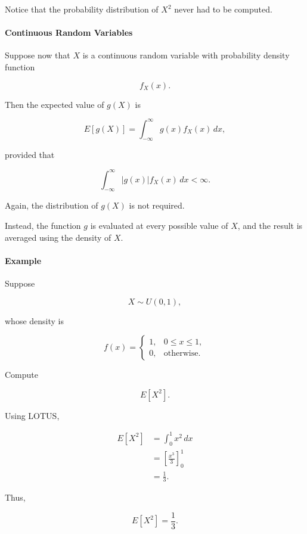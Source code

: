 \documentclass[11pt]{article}
\begin{document}
\begin{mdframed}[
		linewidth=0.8pt,
		roundcorner=6pt,
		backgroundcolor=gray!5,
		linecolor=gray!60,
		innertopmargin=10pt,
		innerbottommargin=10pt,
		innerleftmargin=10pt,
		innerrightmargin=10pt
		]
		Notice that the probability distribution of $X^2$ never had to be computed.
		
		\bigskip
		
		\paragraph{Continuous Random Variables}
		
		Suppose now that $X$ is a continuous random variable with probability
		density function
		
		\[
		f_X(x).
		\]
		
		Then the expected value of $g(X)$ is
		
		\[
		\boxed{
			E[g(X)]
			=
			\int_{-\infty}^{\infty}
			g(x)f_X(x)\,dx,
		}
		\]
		
		provided that
		
		\[
		\int_{-\infty}^{\infty}
		|g(x)|f_X(x)\,dx
		<
		\infty.
		\]
		
		Again, the distribution of $g(X)$ is not required.
		
		Instead, the function $g$ is evaluated at every possible value of $X$, and
		the result is averaged using the density of $X$.
		
		\bigskip
		
		\paragraph{Example}
		
		Suppose
		
		\[
		X\sim U(0,1),
		\]
		
		whose density is
		
		\[
		f(x)=
		\begin{cases}
			1,&0\le x\le1,\\
			0,&\text{otherwise}.
		\end{cases}
		\]
		
		Compute
		
		\[
		E[X^2].
		\]
		
		Using LOTUS,
		
		\[
		\begin{aligned}
			E[X^2]
			&=
			\int_0^1x^2\,dx
			\\[0.3cm]
			&=
			\left[
			\frac{x^3}{3}
			\right]_0^1
			\\[0.3cm]
			&=
			\frac13.
		\end{aligned}
		\]
		
		Thus,
		
		\[
		\boxed{
			E[X^2]=\frac13.
		}
		\]
		

\end{mdframed}
\end{document}

